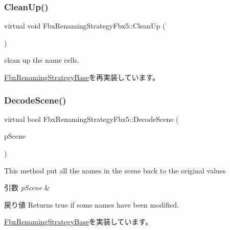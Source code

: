 \subsubsection{\texorpdfstring{Clean\+Up()}{CleanUp()}}
{\footnotesize\ttfamily virtual void Fbx\+Renaming\+Strategy\+Fbx5\+::\+Clean\+Up (\begin{DoxyParamCaption}{ }\end{DoxyParamCaption})\hspace{0.3cm}{\ttfamily [virtual]}}



clean up the name cells. 



\hyperlink{class_fbx_renaming_strategy_base_ae1ab8784f6769fce3068ee21e3c34196}{Fbx\+Renaming\+Strategy\+Base}を再実装しています。

\mbox{\label{class_fbx_renaming_strategy_fbx5_a3af6482297f78deb29a48a9f26ded270}} 
\subsubsection{\texorpdfstring{Decode\+Scene()}{DecodeScene()}}
{\footnotesize\ttfamily virtual bool Fbx\+Renaming\+Strategy\+Fbx5\+::\+Decode\+Scene (\begin{DoxyParamCaption}\item[{\hyperlink{class_fbx_scene}{Fbx\+Scene} $\ast$}]{p\+Scene }\end{DoxyParamCaption})\hspace{0.3cm}{\ttfamily [virtual]}}

This method put all the names in the scene back to the original values 
\begin{DoxyParams}{引数}
{\em p\+Scene} & \\
\hline
\end{DoxyParams}
\begin{DoxyReturn}{戻り値}
Returns true if some names have been modified. 
\end{DoxyReturn}


\hyperlink{class_fbx_renaming_strategy_base_a6c368dff1424b4b54cdfa49ad49bf09c}{Fbx\+Renaming\+Strategy\+Base}を実装しています。

\mbox{\label{class_fbx_renaming_strategy_fbx5_a10862b9d829203cdb2810c2f42c844ee}} 
